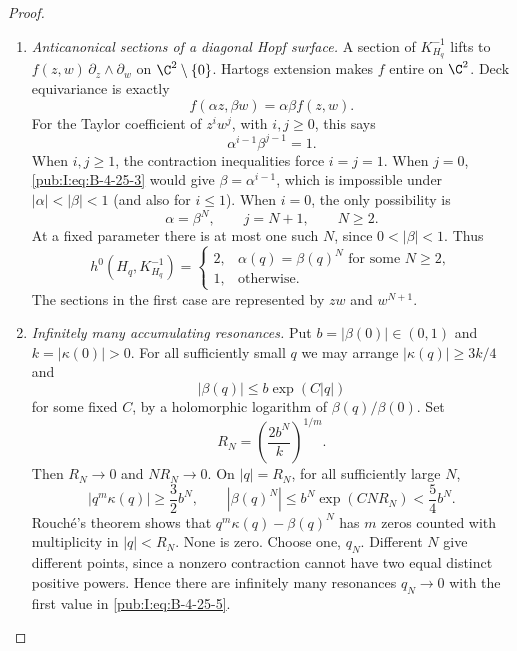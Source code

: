 \begin{proof}
\begin{enumerate}[label=\arabic*.,leftmargin=*]
\item \emph{Anticanonical sections of a diagonal Hopf surface.}
A section of $K_{H_q}^{-1}$ lifts to
$f(z,w)\,\partial_z\wedge\partial_w$ on
$\C^2\setminus\{0\}$. Hartogs extension makes $f$
entire on $\C^2$. Deck equivariance is exactly
\begin{equation}
 f(\alpha z,\beta w)=\alpha\beta f(z,w).
\label{pub:I:eq:B-4-25-2}
\end{equation}
For the Taylor coefficient of $z^i w^j$, with $i,j\ge0$,
this says
\begin{equation}
 \alpha^{i-1}\beta^{j-1}=1.
\label{pub:I:eq:B-4-25-3}
\end{equation}
When $i,j\ge1$, the contraction inequalities force
$i=j=1$. When $j=0$, \eqref{pub:I:eq:B-4-25-3} would give
$\beta=\alpha^{i-1}$, which is impossible under
$|\alpha|<|\beta|<1$ (and also for $i\le1$).
When $i=0$, the only possibility is
\begin{equation}
 \alpha=\beta^N,\qquad j=N+1,\qquad N\ge2.
\label{pub:I:eq:B-4-25-4}
\end{equation}
At a fixed parameter there is at most one such $N$,
since $0<|\beta|<1$. Thus
\begin{equation}
 h^0(H_q,K_{H_q}^{-1})=
 \begin{cases}
 2,&\alpha(q)=\beta(q)^N\text{ for some }N\ge2,\\
 1,&\text{otherwise}.
 \end{cases}
\label{pub:I:eq:B-4-25-5}
\end{equation}
The sections in the first case are represented by
$zw$ and $w^{N+1}$.

\item \emph{Infinitely many accumulating resonances.}
Put $b=|\beta(0)|\in(0,1)$ and $k=|\kappa(0)|>0$.
For all sufficiently small $q$ we may arrange
$|\kappa(q)|\ge3k/4$ and
\[
 |\beta(q)|\le b\exp(C|q|)
\]
for some fixed $C$, by a holomorphic logarithm of
$\beta(q)/\beta(0)$. Set
\[
 R_N=\left(\frac{2b^N}{k}\right)^{1/m}.
\]
Then $R_N\to0$ and $N R_N\to0$. On $|q|=R_N$, for
all sufficiently large $N$,
\[
 |q^m\kappa(q)|\ge\frac32 b^N,
 \qquad |\beta(q)^N|\le b^N\exp(CN R_N)<\frac54 b^N.
\]
Rouch\'e's theorem shows that
$q^m\kappa(q)-\beta(q)^N$ has $m$ zeros counted with
multiplicity in $|q|<R_N$. None is zero. Choose one,
$q_N$. Different $N$ give different points, since a
nonzero contraction cannot have two equal distinct
positive powers. Hence there are infinitely many
resonances $q_N\to0$ with the first value in
\eqref{pub:I:eq:B-4-25-5}.


\end{enumerate}
\end{proof}
